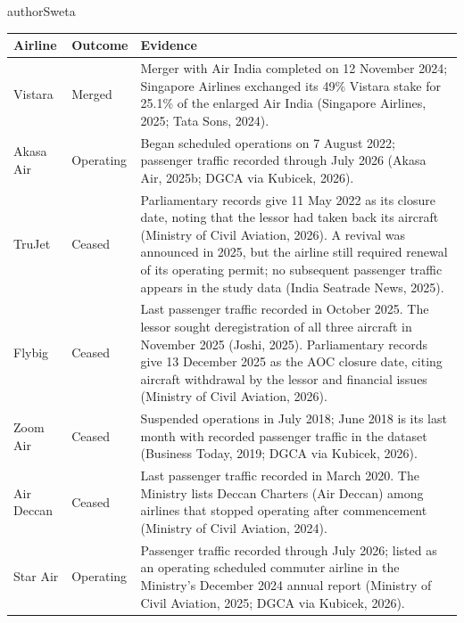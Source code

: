\begin{mergedcontribution}{authorSweta}
\begin{minipage}{\linewidth}
\footnotesize
{}
\label{tab:o3-outcomes}
\fontsize{10}{12}\selectfont{}\setlength{\tabcolsep}{3pt}
\renewcommand{\arraystretch}{1.15}
\begin{tabular}{|>{\raggedright\arraybackslash}p{}|>{\raggedright\arraybackslash}p{}|>{\raggedright\arraybackslash}p{}|}
\hline
\textbf{Airline} & \textbf{Outcome} & \textbf{Evidence} \\
\hline
Vistara & Merged & Merger with Air India completed on 12 November 2024; Singapore Airlines exchanged its 49\% Vistara stake for 25.1\% of the enlarged Air India (Singapore Airlines, 2025; Tata Sons, 2024). \\
\hline
Akasa Air & Operating & Began scheduled operations on 7 August 2022; passenger traffic recorded through July 2026 (Akasa Air, 2025b; DGCA via Kubicek, 2026). \\
\hline
TruJet & Ceased & Parliamentary records give 11 May 2022 as its closure date, noting that the lessor had taken back its aircraft (Ministry of Civil Aviation, 2026). A revival was announced in 2025, but the airline still required renewal of its operating permit; no subsequent passenger traffic appears in the study data (India Seatrade News, 2025). \\
\hline
Flybig & Ceased & Last passenger traffic recorded in October 2025. The lessor sought deregistration of all three aircraft in November 2025 (Joshi, 2025). Parliamentary records give 13 December 2025 as the AOC closure date, citing aircraft withdrawal by the lessor and financial issues (Ministry of Civil Aviation, 2026). \\
\hline
Zoom Air & Ceased & Suspended operations in July 2018; June 2018 is its last month with recorded passenger traffic in the dataset (Business Today, 2019; DGCA via Kubicek, 2026). \\
\hline
Air Deccan & Ceased & Last passenger traffic recorded in March 2020. The Ministry lists Deccan Charters (Air Deccan) among airlines that stopped operating after commencement (Ministry of Civil Aviation, 2024). \\
\hline
Star Air & Operating & Passenger traffic recorded through July 2026; listed as an operating scheduled commuter airline in the Ministry's December 2024 annual report (Ministry of Civil Aviation, 2025; DGCA via Kubicek, 2026). \\

\end{tabular}
\end{minipage}
\end{mergedcontribution}

